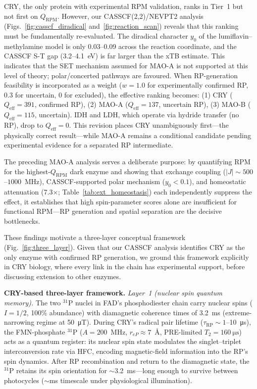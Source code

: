 \documentclass[11pt]{article}
\begin{document}
CRY, the only protein with experimental RPM validation\cite{Xu2021}, ranks in Tier~1 but not first on $Q_\mathrm{RPM}$. However, our CASSCF(2,2)/NEVPT2 analysis (Figs.~\ref{fig:casscf_diradical} and~\ref{fig:reaction_scan}) reveals that this ranking must be fundamentally re-evaluated. The diradical character $y_0$ of the lumiflavin--methylamine model is only 0.03--0.09 across the reaction coordinate, and the CASSCF S-T gap (3.2--4.1~eV) is far larger than the xTB estimate. This indicates that the SET mechanism assumed for MAO-A is not supported at this level of theory; polar/concerted pathways are favoured. When RP-generation feasibility is incorporated as a weight ($w = 1.0$ for experimentally confirmed RP, 0.3 for uncertain, 0 for excluded), the effective ranking becomes: (1) CRY ($Q_\mathrm{eff} = 391$, confirmed RP), (2) MAO-A ($Q_\mathrm{eff} = 137$, uncertain RP), (3) MAO-B ($Q_\mathrm{eff} = 115$, uncertain). IDH and LDH, which operate via hydride transfer (no RP), drop to $Q_\mathrm{eff} = 0$. This revision places CRY unambiguously first---the physically correct result---while MAO-A remains a conditional candidate pending experimental evidence for a separated RP intermediate.

The preceding MAO-A analysis serves a deliberate purpose: by quantifying RPM for the highest-$Q_\mathrm{RPM}$ dark enzyme and showing that exchange coupling ($|J| \sim 500$--$1000$~MHz), CASSCF-supported polar mechanism ($y_0 < 0.1$), and homeostatic attenuation (7.3$\times$; Table~\ref{tab:ext_homeostasis}) each independently suppress the effect, it establishes that high spin-parameter scores alone are insufficient for functional RPM---RP generation and spatial separation are the decisive bottlenecks.

These findings motivate a three-layer conceptual framework (Fig.~\ref{fig:three_layer}). Given that our CASSCF analysis identifies CRY as the only enzyme with confirmed RP generation, we ground this framework explicitly in CRY biology, where every link in the chain has experimental support, before discussing extension to other enzymes.

\textbf{CRY-based three-layer framework.} \emph{Layer~1 (nuclear spin quantum memory).} The two $^{31}$P nuclei in FAD's phosphodiester chain carry nuclear spins ($I = 1/2$, 100\% abundance) with diamagnetic coherence times of 3.2~ms (extreme-narrowing regime at 50~\si{\micro\tesla}). During CRY's radical pair lifetime ($\tau_\mathrm{RP} \sim 1$--10~\si{\micro\second}\cite{Maeda2012}), the FMN-phosphate $^{31}$P ($A = 200$~MHz, $r_{eP} \approx 7$~\AA, PRE-limited $T_2 = 160~\si{\micro\second}$) acts as a quantum register: its nuclear spin state modulates the singlet--triplet interconversion rate via HFC, encoding magnetic-field information into the RP's spin dynamics. After RP recombination and return to the diamagnetic state, the $^{31}$P retains its spin orientation for $\sim$3.2~ms---long enough to survive between photocycles ($\sim$ms timescale under physiological illumination).
\end{document}
